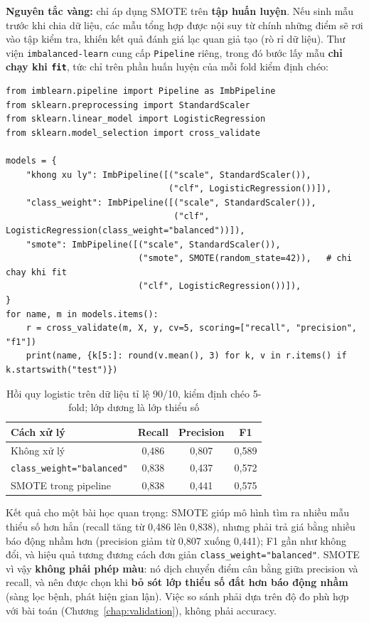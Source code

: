 \noindent\textbf{Nguyên tắc vàng:} chỉ áp dụng SMOTE trên \textbf{tập huấn luyện}. Nếu sinh mẫu trước khi chia dữ liệu, các mẫu tổng hợp được nội suy từ chính những điểm sẽ rơi vào tập kiểm tra, khiến kết quả đánh giá lạc quan giả tạo (rò rỉ dữ liệu). Thư viện \texttt{imbalanced-learn} cung cấp \texttt{Pipeline} riêng, trong đó bước lấy mẫu \textbf{chỉ chạy khi \texttt{fit}}, tức chỉ trên phần huấn luyện của mỗi fold kiểm định chéo:

\begin{lstlisting}[caption={So sánh các cách xử lý mất cân bằng trong Pipeline của imbalanced-learn}]
from imblearn.pipeline import Pipeline as ImbPipeline
from sklearn.preprocessing import StandardScaler
from sklearn.linear_model import LogisticRegression
from sklearn.model_selection import cross_validate

models = {
    "khong xu ly": ImbPipeline([("scale", StandardScaler()),
                                ("clf", LogisticRegression())]),
    "class_weight": ImbPipeline([("scale", StandardScaler()),
                                 ("clf", LogisticRegression(class_weight="balanced"))]),
    "smote": ImbPipeline([("scale", StandardScaler()),
                          ("smote", SMOTE(random_state=42)),   # chi chay khi fit
                          ("clf", LogisticRegression())]),
}
for name, m in models.items():
    r = cross_validate(m, X, y, cv=5, scoring=["recall", "precision", "f1"])
    print(name, {k[5:]: round(v.mean(), 3) for k, v in r.items() if k.startswith("test")})
\end{lstlisting}

\begin{table}[H]
\centering
\begin{tabular}{|l|c|c|c|}
\hline
\textbf{Cách xử lý} & \textbf{Recall} & \textbf{Precision} & \textbf{F1} \\
\hline
Không xử lý & 0,486 & 0,807 & 0,589 \\ \hline
\texttt{class\_weight="balanced"} & 0,838 & 0,437 & 0,572 \\ \hline
SMOTE trong pipeline & 0,838 & 0,441 & 0,575 \\ \hline
\end{tabular}
\caption{Hồi quy logistic trên dữ liệu tỉ lệ 90/10, kiểm định chéo 5-fold; lớp dương là lớp thiểu số}
\label{tab:smote-compare}
\end{table}

Kết quả cho một bài học quan trọng: SMOTE giúp mô hình tìm ra nhiều mẫu thiểu số hơn hẳn (recall tăng từ 0,486 lên 0,838), nhưng phải trả giá bằng nhiều báo động nhầm hơn (precision giảm từ 0,807 xuống 0,441); F1 gần như không đổi, và hiệu quả tương đương cách đơn giản \texttt{class\_weight="balanced"}. SMOTE vì vậy \textbf{không phải phép màu}: nó dịch chuyển điểm cân bằng giữa precision và recall, và nên được chọn khi \textbf{bỏ sót lớp thiểu số đắt hơn báo động nhầm} (sàng lọc bệnh, phát hiện gian lận). Việc so sánh phải dựa trên độ đo phù hợp với bài toán (Chương~\ref{chap:validation}), không phải accuracy.

